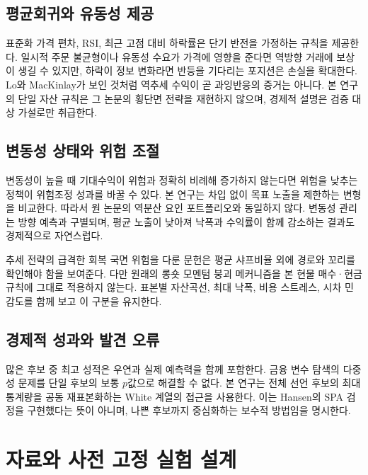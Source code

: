 \documentclass[11pt,a4paper]{article}
\begin{document}
\subsection{평균회귀와 유동성 제공}
표준화 가격 편차, RSI, 최근 고점 대비 하락률은 단기 반전을 가정하는 규칙을 제공한다. 일시적 주문 불균형이나 유동성 수요가 가격에 영향을 준다면 역방향 거래에 보상이 생길 수 있지만, 하락이 정보 변화라면 반등을 기다리는 포지션은 손실을 확대한다. Lo와 MacKinlay\cite{contrarian}가 보인 것처럼 역추세 수익이 곧 과잉반응의 증거는 아니다. 본 연구의 단일 자산 규칙은 그 논문의 횡단면 전략을 재현하지 않으며, 경제적 설명은 검증 대상 가설로만 취급한다.

\subsection{변동성 상태와 위험 조절}
변동성이 높을 때 기대수익이 위험과 정확히 비례해 증가하지 않는다면 위험을 낮추는 정책이 위험조정 성과를 바꿀 수 있다\cite{volmanaged}. 본 연구는 차입 없이 목표 노출을 제한하는 변형을 비교한다. 따라서 원 논문의 역분산 요인 포트폴리오와 동일하지 않다. 변동성 관리는 방향 예측과 구별되며, 평균 노출이 낮아져 낙폭과 수익률이 함께 감소하는 결과도 경제적으로 자연스럽다.

추세 전략의 급격한 회복 국면 위험을 다룬 문헌\cite{crashes}은 평균 샤프비율 외에 경로와 꼬리를 확인해야 함을 보여준다. 다만 원래의 롱숏 모멘텀 붕괴 메커니즘을 본 현물 매수·현금 규칙에 그대로 적용하지 않는다. 표본별 자산곡선, 최대 낙폭, 비용 스트레스, 시차 민감도를 함께 보고 이 구분을 유지한다.

\subsection{경제적 성과와 발견 오류}
많은 후보 중 최고 성적은 우연과 실제 예측력을 함께 포함한다. 금융 변수 탐색의 다중성 문제\cite{factorzoo}를 단일 후보의 보통 $p$값으로 해결할 수 없다. 본 연구는 전체 선언 후보의 최대 통계량을 공동 재표본화하는 White 계열의 접근\cite{white}을 사용한다. 이는 Hansen의 SPA 검정\cite{hansen}을 구현했다는 뜻이 아니며, 나쁜 후보까지 중심화하는 보수적 방법임을 명시한다.

\section{자료와 사전 고정 실험 설계}
\end{document}
